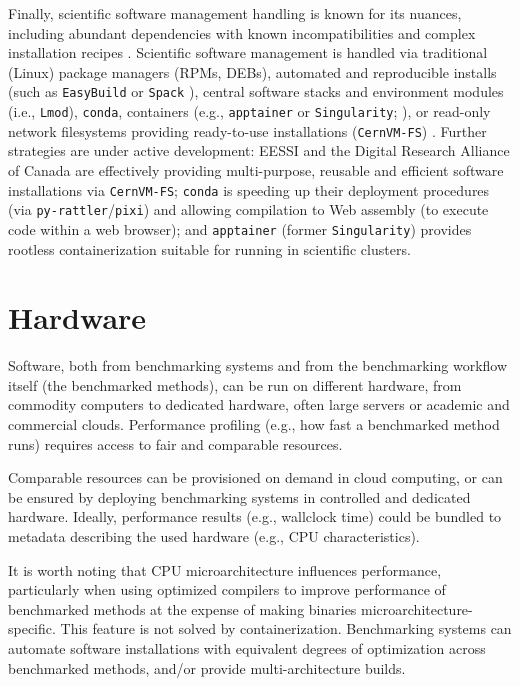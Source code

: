 \documentclass[11pt]{article}
\begin{document}
Finally, scientific software management handling is known for its nuances, including abundant dependencies with known incompatibilities and complex installation recipes \cite{droge2023-ax}. Scientific software management is handled via traditional (Linux) package managers (RPMs, DEBs), automated and reproducible installs (such as \texttt{EasyBuild} \cite{Hoste2012-gg} or \texttt{Spack} \cite{Gamblin2015-ll}), central software stacks and environment modules (i.e., \texttt{Lmod}), \texttt{conda}, containers (e.g., \texttt{apptainer} or \texttt{Singularity}; \cite{Kurtzer2017-mn}), or read-only network filesystems providing ready-to-use installations (\texttt{CernVM-FS}) \cite{Blomer2013-jk}. Further strategies are under active development: EESSI \cite{droge2023-ax} and the Digital Research Alliance of Canada \cite{Boissonneault2019-wm} are effectively providing multi-purpose, reusable and efficient software installations via \texttt{CernVM-FS}; \texttt{conda} is speeding up their deployment procedures (via \texttt{py-rattler}/\texttt{pixi}) and allowing compilation to Web assembly (to execute code within a web browser); and \texttt{apptainer} (former \texttt{Singularity}) provides rootless containerization suitable for running in scientific clusters. 

\section*{Hardware}

Software, both from benchmarking systems and from the benchmarking workflow itself (the benchmarked methods), can be run on different hardware, from commodity computers to dedicated hardware, often large servers or academic and commercial clouds. Performance profiling (e.g., how fast a benchmarked method runs) requires access to fair and comparable resources. 

Comparable resources can be provisioned on demand in cloud computing, or can be ensured by deploying benchmarking systems in controlled and dedicated hardware. Ideally, performance results (e.g., wallclock time) could be bundled to metadata describing the used hardware (e.g., CPU characteristics).

It is worth noting that CPU microarchitecture influences performance, particularly when using optimized compilers to improve performance of benchmarked methods at the expense of making binaries microarchitecture-specific. This feature is not solved by containerization. Benchmarking systems can automate software installations with equivalent degrees of optimization across benchmarked methods, and/or provide multi-architecture builds.
\end{document}
